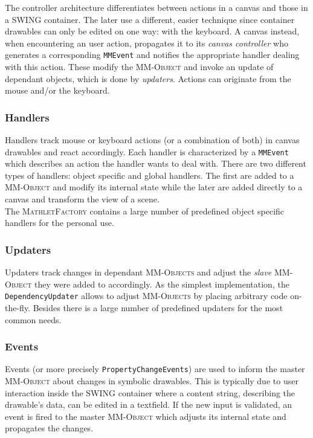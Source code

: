\documentclass[a4paper,12pt]{article}
\newcommand{\name}[1]{\textsc{#1}}
\newcommand{\codename}[1]{\texttt{\small #1}}
\newcommand{\mf}{\name{MathletFactory }}
\newcommand{\mmo}{\name{MM-Object }}
\newcommand{\mmos}{\name{MM-Objects }}
\begin{document}
The controller architecture differentiates between actions in a canvas and those in a SWING container.
The later use a different, easier technique since container drawables can only be edited on one way: with
the keyboard. A canvas instead,  when encountering an user action, propagates it to its 
\textit{canvas controller} who generates a corresponding \codename{MMEvent} and notifies the appropriate 
handler dealing with this action. These modify the \mmo and invoke an update of dependant objects, which
is done by \textit{updaters}.
Actions can originate from the mouse and/or the keyboard.


\subsubsection*{Handlers}

Handlers track mouse or keyboard actions (or a combination of both) in canvas drawables and react
accordingly. Each handler is characterized by a \codename{MMEvent} which describes an action the handler 
wants to deal with. There are two different types of handlers: object specific and global handlers.
The first are added to a \mmo and modify its internal state while the later are added directly to a canvas 
and transform the view of a scene.\\
The \mf contains a large number of predefined object specific handlers for the personal use.

\subsubsection*{Updaters}

Updaters track changes in dependant \mmos and adjust the \textit{slave} \mmo they were added to accordingly.
As the simplest implementation, the \codename{DependencyUpdater} allows to adjust \mmos by placing arbitrary 
code on-the-fly. Besides there is a large number of predefined updaters for the most common needs.

\subsubsection*{Events}

Events (or more precisely \codename{PropertyChangeEvents}) are used to inform the master \mmo about changes
in symbolic drawables. This is typically due to user interaction inside the SWING container where a
content string, describing the drawable's data, can be edited in a textfield. If the new input is
validated, an event is fired to the master \mmo which adjusts its internal state and propagates the
changes.
\end{document}

